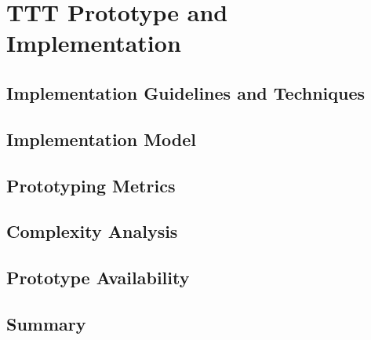 
%

\chapter{TTT Prototype and Implementation}\label{cha:implementation}

\section{Implementation Guidelines and Techniques}\label{sec:implementation_guidelines}

\section{Implementation Model}\label{sec:implementation_model}

\section{Prototyping Metrics}\label{sec:prototyping_metrics}

\section{Complexity Analysis}\label{sec:complexity_analysis}

\section{Prototype Availability}\label{sec:prototype_availability}

\section{Summary}\label{sec:implementation_summary}